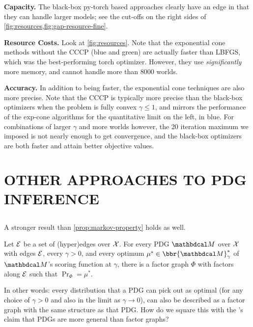 \documentclass{article}
\begin{document}
\textbf{Capacity.}
The black-box py-torch based approaches clearly have an edge in that they can handle larger models; see the cut-offs on the right sides of \cref{fig:resources,fig:gap-resource-fine}.

\textbf{Resource Costs.}
Look at \cref{fig:resources}.
Note that the exponential cone methods without the CCCP (blue and green) are actually faster than LBFGS, which was the best-performing torch optimizer.
However, they use \emph{significantly} more memory, and cannot handle more than 8000 worlds.


\textbf{Accuracy.}
In addition to being faster, the exponential cone techniques are also more precise.
Note that the CCCP is typically more precise than the black-box optimizers when the problem is fully convex $\gamma \le 1$, and mirrors the performance of the exp-cone algorithms for the quantitative limit on the left, in blue.  For combinations of larger $\gamma$ and more worlds however, the 20 iteration maximum we imposed is not nearly enough to get convergence, and the black-box optimizers are both faster and attain better objective values.



\section{OTHER APPROACHES TO PDG INFERENCE} \label{sec:other-inference}

\subsection{}
A stronger result than \cref{prop:markov-property} holds as well.
\begin{prop}\label{prop:same-set-dists}
    Let $\mathcal E$ be a set of (hyper)edges over $\mathcal X$.
    For every PDG $\dg M$ over $\mathcal X$ with edges $\mathcal E$, every $\gamma > 0$, and every optimum $\mu^* \in \bbr{\dg M}_\gamma^*$ of $\dg M$'s scoring function at $\gamma$,
    there is a factor graph $\Phi$ with factors along $\mathcal E$ such that $\Pr_\Phi = \mu^*$.
\end{prop}

In other words: every distribution that a PDG can pick out as optimal (for any choice of $\gamma > 0$ and also in the limit as $\gamma \to 0$), can also be described as a factor graph with the same structure as that PDG.
How do we square this with the \citeauthor{pdg-aaai}'s claim that PDGs are more general than factor graphs?
\end{document}
